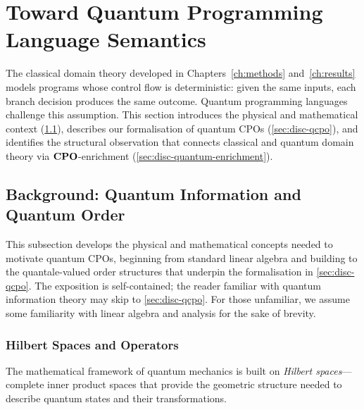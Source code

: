 \section{Toward Quantum Programming Language Semantics}
\label{sec:disc-quantum}

The classical domain theory developed in Chapters~\ref{ch:methods}
and~\ref{ch:results} models programs whose control flow is
deterministic: given the same inputs, each branch decision produces
the same outcome.
Quantum programming languages challenge this assumption.
This section introduces the physical and mathematical context (\cref{sec:disc-quantum-bg}),
describes our formalisation of quantum CPOs (\cref{sec:disc-qcpo}),
and identifies the structural observation that connects classical and
quantum domain theory via $\mathbf{CPO}$-enrichment
(\cref{sec:disc-quantum-enrichment}).

\subsection{Background: Quantum Information and Quantum Order}
\label{sec:disc-quantum-bg}

This subsection develops the physical and mathematical concepts
needed to motivate quantum CPOs, beginning from standard linear
algebra and building to the quantale-valued order structures that
underpin the formalisation in \cref{sec:disc-qcpo}.
The exposition is self-contained; the reader familiar with quantum
information theory may skip to \cref{sec:disc-qcpo}. For those unfamiliar,
we assume some familiarity with linear algebra and analysis for the sake of brevity.

\subsubsection{Hilbert Spaces and Operators}

The mathematical framework of quantum mechanics is built on
\emph{Hilbert spaces}---complete inner product spaces that provide
the geometric structure needed to describe quantum states and their
transformations.

